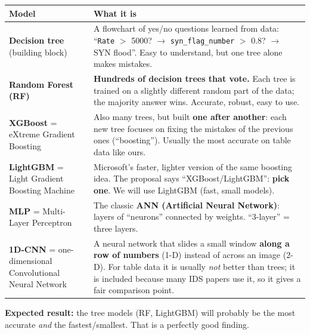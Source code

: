 \documentclass[11pt]{article}
\begin{document}
\begin{longtable}{@{}>{\raggedright}p{4.2cm} >{\raggedright\arraybackslash}p{11.8cm}@{}}
\toprule
\textbf{Model} & \textbf{What it is} \\
\midrule
\endhead
\textbf{Decision tree} (building block) & A flowchart of yes/no questions learned from data:
``\texttt{Rate} $>$ 5000? $\rightarrow$ \texttt{syn\_flag\_number} $>$ 0.8? $\rightarrow$ SYN flood''. Easy to understand, but one tree alone makes mistakes. \\
\textbf{Random Forest (RF)} & \textbf{Hundreds of decision trees that vote.} Each tree is trained on a slightly different random part of the data; the majority answer wins. Accurate, robust, easy to use. \\
\textbf{XGBoost} = eXtreme Gradient Boosting & Also many trees, but built \textbf{one after another}: each new tree focuses on fixing the mistakes of the previous ones (``boosting''). Usually the most accurate on table data like ours. \\
\textbf{LightGBM} = Light Gradient Boosting Machine & Microsoft's faster, lighter version of the same boosting idea. The proposal says ``XGBoost/LightGBM'': \textbf{pick one}. We will use LightGBM (fast, small models). \\
\textbf{MLP} = Multi-Layer Perceptron & The classic \textbf{ANN (Artificial Neural Network)}: layers of ``neurons'' connected by weights. ``3-layer'' = three layers. \\
\textbf{1D-CNN} = one-dimensional Convolutional Neural Network & A neural network that slides a small window \textbf{along a row of numbers} (1-D) instead of across an image (2-D). For table data it is usually \emph{not} better than trees; it is included because many IDS papers use it, so it gives a fair comparison point. \\
\bottomrule
\end{longtable}

\textbf{Expected result:} the tree models (RF, LightGBM) will probably be the most accurate \emph{and} the fastest/smallest. That is a perfectly good finding.
\end{document}

